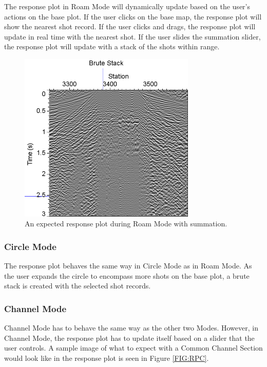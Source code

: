 \documentclass[12pt]{article}
\begin{document}
The response plot in Roam Mode will dynamically update based on the user's actions on the base plot. If the user clicks on the base map, the response plot will show the nearest shot record. If the user clicks and drags, the response plot will update in real time with the nearest shot. If the user slides the summation slider, the response plot will update with a stack of the shots within range.

\begin{figure}[H]
\centering
\includegraphics[width=0.75\textwidth]{./figs/fig3.png}
\caption{An expected response plot during Roam Mode with summation.}
\label{FIG:RPR}
\end{figure}

\subsubsection{Circle Mode}

The response plot behaves the same way in Circle Mode as in Roam Mode. As the user expands the circle to encompass more shots on the base plot, a brute stack is created with the selected shot records. 

\subsubsection{Channel Mode}

Channel Mode has to behave the same way as the other two Modes. However, in Channel Mode, the response plot has to update itself based on a slider that the user controls. A sample image of what to expect with a Common Channel Section would look like in the response plot is seen in Figure \ref{FIG:RPC}.
\end{document}
